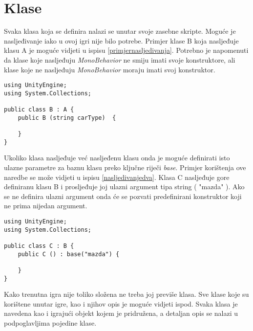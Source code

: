\section{Klase}
Svaka klasa koja se definira nalazi se unutar svoje zasebne skripte. Moguće je nasljeđivanje iako u ovoj igri nije bilo potrebe. Primjer klase B koja nasljeđuje klasu A je moguće vidjeti u ispisu \ref{primjernasljedivanja}. Potrebno je napomenuti da klase koje nasljeđuju \emph{MonoBehavior} ne smiju imati svoje konstruktore, ali klase koje ne nasljeđuju \emph{MonoBehavior} moraju imati svoj konstruktor. 
\begin{lstlisting}[caption={Primjer nasljeđivanja}, label=primjernasljedivanja]
using UnityEngine;
using System.Collections;

public class B : A {
	public B (string carType)  {
	
	}	
}
\end{lstlisting}
Ukoliko klasa nasljeđuje već nasljeđenu klasu onda je moguće definirati isto ulazne parametre za baznu klasu preko ključne riječi \emph{base}. Primjer korištenja ove naredbe se može vidjeti u ispisu \ref{nasljedivanjedva}. Klasa C nasljeđuje gore definiranu klasu B i prosljeđuje joj ulazni argument tipa string ( "mazda" ). Ako se ne definira ulazni argument onda će se pozvati predefinirani konstruktor koji ne prima nijedan argument.

\begin{lstlisting}[caption={Primjer nasljeđivanja nasljeđene klase}, label=nasljedivanjedva]
using UnityEngine;
using System.Collections;

public class C : B {
	public C () : base("mazda") {
	
	}	
}
\end{lstlisting}

Kako trenutna igra nije toliko složena ne treba joj previše klasa. Sve klase koje su korištene unutar igre, kao i njihov opis je moguće vidjeti ispod. Svaka klasa je navedena kao i igrajući objekt kojem je pridružena, a detaljan opis se nalazi u podpoglavljima pojedine klase.
\newpage

